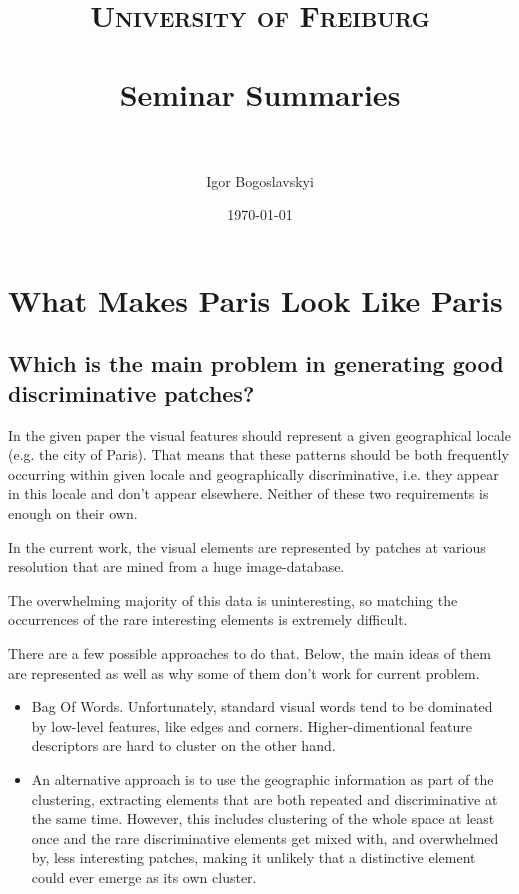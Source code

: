 \documentclass[paper=a4, fontsize=11pt]{scrartcl} %
\title{	
\normalfont \normalsize 
\textsc{University of Freiburg} \\ [25pt] %
\horrule{0.5pt} \\[0.4cm] %
\huge Seminar Summaries \\ %
\horrule{2pt} \\[0.5cm] %
}
\author{Igor Bogoslavskyi} %
\date{\normalsize\today} %
\numberwithin{equation}{section} %
\numberwithin{figure}{section} %
\numberwithin{table}{section} %
\begin{document}
\maketitle %


\section{What Makes Paris Look Like Paris}
\subsection{Which is the main problem in generating good discriminative patches?}
In the given paper the visual features should represent a given geographical locale (e.g. the city of Paris). That means that these patterns should be both frequently occurring within given locale and geographically discriminative, i.e. they appear in this locale and don't appear elsewhere. Neither of these two requirements is enough on their own.

In the current work, the visual elements are represented by patches at various resolution that are mined from a huge image-database.

The overwhelming majority of this data is uninteresting, so matching the occurrences of the rare interesting elements is extremely difficult.

There are a few possible approaches to do that. Below, the main ideas of them are represented as well as why some of them don't work for current problem. 
\begin{itemize}
\item Bag Of Words. Unfortunately, standard visual words tend to be dominated by low-level features, like edges and corners. Higher-dimentional feature descriptors are hard to cluster on the other hand.
\item An alternative approach is to use the geographic information as part of the clustering, extracting elements that are both repeated and discriminative at the same time. However, this includes clustering of the whole space at least once and the rare discriminative elements get mixed with, and overwhelmed by, less interesting patches, making it unlikely that a distinctive element could ever emerge as its own cluster.
\end{itemize}
\end{document}
